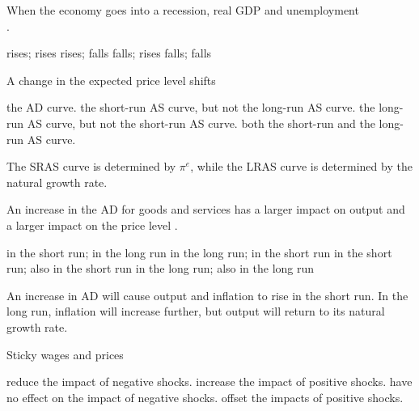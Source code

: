 \documentclass[addpoints,11pt]{exam}
\theoremstyle{definition}
\newcommand{\blank}[0]{\underline{\hspace{3cm}}}
\begin{document}
\begin{questions}


\question When the economy goes into a recession, real GDP \blank and unemployment \\ \blank.

\begin{choices}
	\choice rises; rises
	\choice rises; falls
	\CorrectChoice falls; rises
	\choice falls; falls
\end{choices}



\question A change in the expected price level shifts 

\begin{choices}
	\choice the AD curve.
	\CorrectChoice the short-run AS curve, but not the long-run AS curve.
	\choice the long-run AS curve, but not the short-run AS curve. 
	\choice both the short-run and the long-run AS curve.
\end{choices}

\begin{solution}
	The SRAS curve is determined by $\pi^e$, while the LRAS curve is determined by the natural growth rate.
\end{solution}

\question An increase in the AD for goods and services has a larger impact on output  \blank  and a larger impact on the price level \blank.

\begin{choices}
	\CorrectChoice in the short run; in the long run
	\choice in the long run; in the short run
	\choice in the short run; also in the short run
	\choice in the long run; also in the long run
\end{choices}

\begin{solution}
	An increase in AD will cause output and inflation to rise in the short run. In the long run, inflation will increase further, but output will return to its natural growth rate.
\end{solution}

\newpage

\question Sticky wages and prices 

\begin{choices}
	\choice reduce the impact of negative shocks.
	\CorrectChoice increase the impact of positive shocks.
	\choice have no effect on the impact of negative shocks. 
	\choice offset the impacts of positive shocks.
\end{choices}


\end{questions}
\end{document}
